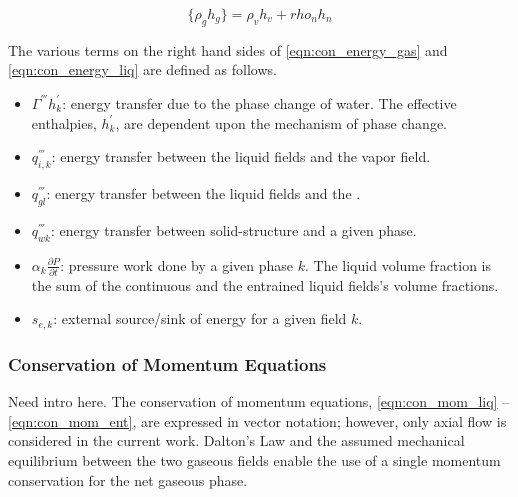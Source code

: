 \begin{equation}
\label{eqn:gaseous_enthalpy}
\{\rho_g h_g\} = \rho_v h_v + rho_n h_n
\end{equation}

The various terms on the right hand sides of \eqref{eqn:con_energy_gas} and \eqref{eqn:con_energy_liq} are defined as follows.
\begin{itemize}
\item{
$\Gamma^{'''} h^{'}_k$:
 energy transfer due to the phase change of water.
 The effective enthalpies, $h^{'}_k$, are dependent upon the mechanism of phase change.
}
\item{
$q^{'''}_{i,k}$:
energy transfer between the liquid fields and the vapor field.
}
\item{
$q^{'''}_{gl}$:
energy transfer between the liquid fields and the \ncgs.
}
\item{
$q^{'''}_{wk}$:
 energy transfer between solid-structure and a given phase.
}
\item{
$\alpha_k \frac{\partial P}{\partial t}$:
 pressure work done by a given phase $k$.
 The liquid volume fraction is the sum of the continuous and the entrained liquid fields's volume fractions.
}
\item{
$s_{e,k}$:
 external source/sink of energy for a given field $k$.
}
\end{itemize}

\subsubsection{Conservation of Momentum Equations}
\label{subsubsect:momentum_equations}

Need intro here.
The conservation of momentum equations, \eqref{eqn:con_mom_liq} -- \eqref{eqn:con_mom_ent}, are expressed in vector notation; however, only axial flow is considered in the current work.
Dalton's Law and the assumed mechanical equilibrium between the two gaseous fields enable the use of a single momentum conservation for the net gaseous phase.

